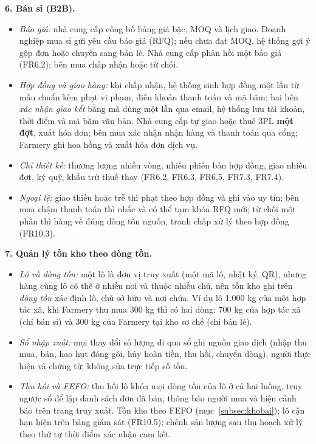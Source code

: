\noindent\textbf{6. Bán sỉ (B2B).}
\begin{itemize}
    \item \emph{Báo giá:} nhà cung cấp công bố bảng giá bậc, MOQ và lịch giao. Doanh nghiệp mua sỉ gửi yêu cầu báo giá (RFQ); nếu chưa đạt MOQ, hệ thống gợi ý gộp đơn hoặc chuyển sang bán lẻ. Nhà cung cấp phản hồi một báo giá (FR6.2); bên mua chấp nhận hoặc từ chối.
    \item \emph{Hợp đồng và giao hàng:} khi chấp nhận, hệ thống sinh hợp đồng một lần từ mẫu chuẩn kèm phạt vi phạm, điều khoản thanh toán và mã băm; hai bên \emph{xác nhận giao kết} bằng mã dùng một lần qua email, hệ thống lưu tài khoản, thời điểm và mã băm văn bản. Nhà cung cấp tự giao hoặc thuê 3PL \textbf{một đợt}, xuất hóa đơn; bên mua xác nhận nhận hàng và thanh toán qua cổng; Farmery ghi hoa hồng và xuất hóa đơn dịch vụ.
    \item \emph{Chỉ thiết kế:} thương lượng nhiều vòng, nhiều phiên bản hợp đồng, giao nhiều đợt, ký quỹ, khấu trừ thuế thay (FR6.2, FR6.3, FR6.5, FR7.3, FR7.4).
    \item \emph{Ngoại lệ:} giao thiếu hoặc trễ thì phạt theo hợp đồng và ghi vào uy tín; bên mua chậm thanh toán thì nhắc và có thể tạm khóa RFQ mới; từ chối một phần thì hàng về đúng dòng tồn nguồn, tranh chấp xử lý theo hợp đồng (FR10.3).
\end{itemize}

\noindent\textbf{7. Quản lý tồn kho theo dòng tồn.}
\begin{itemize}
    \item \emph{Lô và dòng tồn:} một lô là đơn vị truy xuất (một mã lô, nhật ký, QR), nhưng hàng cùng lô có thể ở nhiều nơi và thuộc nhiều chủ, nên tồn kho ghi trên \emph{dòng tồn} xác định lô, chủ sở hữu và nơi chứa. Ví dụ lô 1.000 kg của một hợp tác xã, khi Farmery thu mua 300 kg thì có hai dòng: 700 kg của hợp tác xã (chỉ bán sỉ) và 300 kg của Farmery tại kho sơ chế (chỉ bán lẻ).
    \item \emph{Sổ nhập xuất:} mọi thay đổi số lượng đi qua sổ ghi nguồn giao dịch (nhập thu mua, bán, hao hụt đóng gói, hủy hoàn tiền, thu hồi, chuyển dòng), người thực hiện và chứng từ; không sửa trực tiếp số tồn.
    \item \emph{Thu hồi và FEFO:} thu hồi lô khóa mọi dòng tồn của lô ở cả hai luồng, truy ngược sổ để lập danh sách đơn đã bán, thông báo người mua và hiện cảnh báo trên trang truy xuất. Tồn kho theo FEFO (mục~\ref{subsec:khobai}); lô cận hạn hiện trên bảng giám sát (FR10.5); chênh sản lượng sau thu hoạch xử lý theo thứ tự thời điểm xác nhận cam kết.
\end{itemize}


